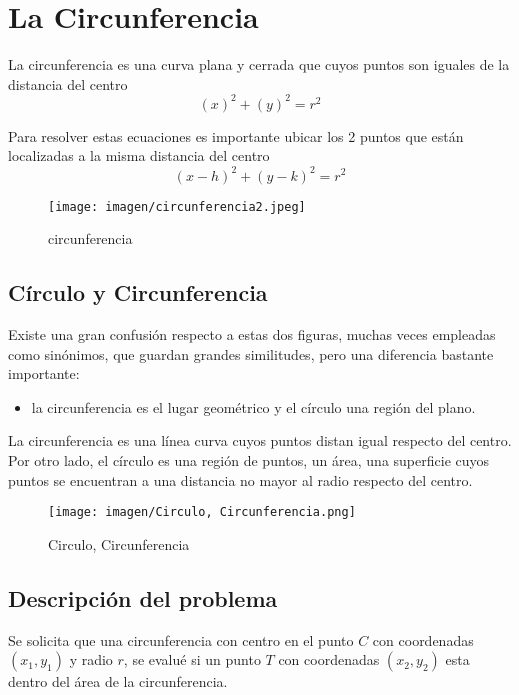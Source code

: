 \section{La Circunferencia}
La circunferencia es una curva plana y cerrada que cuyos puntos son iguales de la distancia del centro
\begin{equation}
    (x)^{2} + (y )^{2} =r^{2}
\end{equation}

Para resolver estas ecuaciones es importante ubicar los 2 puntos que están localizadas a la misma distancia del centro
\begin{equation}
    (x - h)^{2} + (y - k)^{2} =r^{2}
\end{equation}

\begin {figure}[h!]
\centerline{\texttt{[image: imagen/circunferencia2.jpeg]}}
\caption{circunferencia}
\label{fig}
\end {figure}

\subsection{Círculo y Circunferencia}

Existe una gran confusión respecto a estas dos figuras, muchas veces empleadas como sinónimos, que guardan grandes similitudes, pero una diferencia bastante importante:
\begin{itemize}
\item la circunferencia es el lugar geométrico y el círculo una región del plano.
\end{itemize}

La circunferencia es una línea curva cuyos puntos distan igual respecto del centro. Por otro lado, el círculo es una región de puntos, un área, una superficie cuyos puntos se encuentran a una distancia no mayor al radio respecto del centro.

\begin {figure}[h!]
\centerline{\texttt{[image: imagen/Circulo, Circunferencia.png]}}
\caption{Circulo, Circunferencia}
\label{fig}
\end {figure}

\subsection{Descripción del problema}

Se solicita que una circunferencia con centro en el punto $C$ con coordenadas $(x_{1}, y_{1})$ y radio $r$, se evalué si un punto $T$ con coordenadas $(x_{2}, y_{2})$ esta dentro del área de la circunferencia.

